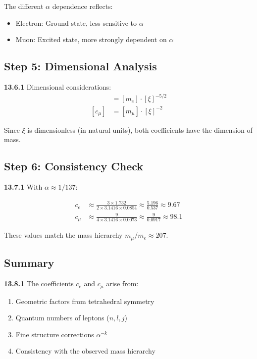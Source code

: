 \documentclass[12pt,a4paper]{article}
\begin{document}
The different $\alpha$ dependence reflects:
\begin{itemize}
	\item Electron: Ground state, less sensitive to $\alpha$
	\item Muon: Excited state, more strongly dependent on $\alpha$
\end{itemize}

\subsection{Step 5: Dimensional Analysis}

\noindent \textbf{13.6.1} Dimensional considerations:
\begin{align*}
	[c_e] &= [m_e] \cdot [\xi]^{-5/2} \\
	[c_\mu] &= [m_\mu] \cdot [\xi]^{-2}
\end{align*}

Since $\xi$ is dimensionless (in natural units), both coefficients have the dimension of mass.

\subsection{Step 6: Consistency Check}

\noindent \textbf{13.7.1} With $\alpha \approx 1/137$:

\begin{align*}
	c_e &\approx \frac{3 \times 1.732}{2 \times 3.1416 \times 0.0854} \approx \frac{5.196}{0.537} \approx 9.67 \\
	c_\mu &\approx \frac{9}{4 \times 3.1416 \times 0.0073} \approx \frac{9}{0.0917} \approx 98.1
\end{align*}

These values match the mass hierarchy $m_\mu/m_e \approx 207$.

\subsection{Summary}

\noindent \textbf{13.8.1} The coefficients $c_e$ and $c_\mu$ arise from:
\begin{enumerate}
	\item Geometric factors from tetrahedral symmetry
	\item Quantum numbers of leptons ($n,l,j$)
	\item Fine structure corrections $\alpha^{-k}$
	\item Consistency with the observed mass hierarchy
\end{enumerate}
\end{document}
